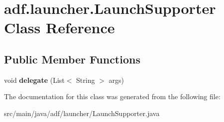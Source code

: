 \hypertarget{classadf_1_1launcher_1_1LaunchSupporter}{}\section{adf.\+launcher.\+Launch\+Supporter Class Reference}
\label{classadf_1_1launcher_1_1LaunchSupporter}
\subsection*{Public Member Functions}
\begin{DoxyCompactItemize}
\item 
\hypertarget{classadf_1_1launcher_1_1LaunchSupporter_a5baa93a611aa5d8f70c9fa5f10504957}{}\label{classadf_1_1launcher_1_1LaunchSupporter_a5baa93a611aa5d8f70c9fa5f10504957} 
void {\bfseries delegate} (List$<$ String $>$ args)
\end{DoxyCompactItemize}


The documentation for this class was generated from the following file\+:\begin{DoxyCompactItemize}
\item 
src/main/java/adf/launcher/Launch\+Supporter.\+java\end{DoxyCompactItemize}
